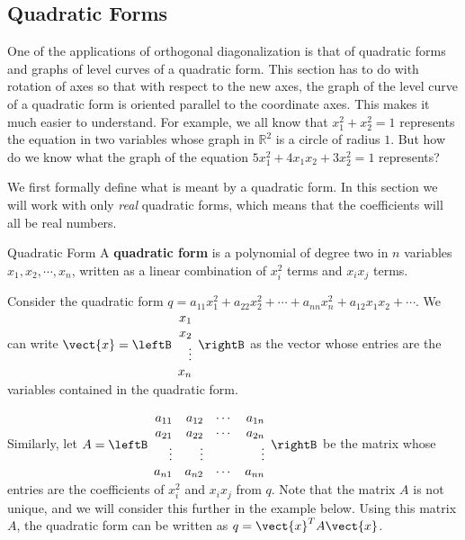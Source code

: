 \subsection{Quadratic Forms}

One of the applications of orthogonal diagonalization is that of quadratic forms and graphs of level curves of a quadratic form. This section has to do with rotation of axes
so that with respect to the new axes, the graph of the level curve of a
quadratic form is oriented parallel to the coordinate axes. This makes it
much easier to understand. For example, we all know that $x_1^2 + x_2^2=1$ represents the equation in two variables whose graph in $\mathbb{R}^2$ is a circle of radius $1$. But how do we know what the graph of the equation $5x_1^2 + 4x_1x_2 + 3x_2^2=1$ represents?  

We first formally define what is meant by a quadratic form. In this section we will work with only \textit{real} quadratic forms, which means that the coefficients will all be real numbers. 

\begin{definition}{Quadratic Form}\label{def:quadraticform}
A \textbf{quadratic form} is a polynomial of degree two in $n$ variables $x_1, x_2, \cdots, x_n$, written as a linear combination of $x_i^{2}$ terms and $x_ix_j$ terms. 
\end{definition}

Consider the quadratic form $q = a_{11}x_1^2 + a_{22}x_2^2 + \cdots + a_{nn}x_n^2 + a_{12}x_1x_2 + \cdots$. We can write $\vect{x} = \leftB 
\begin{array}{r}
x_1 \\
x_2 \\
\vdots \\
x_n
\end{array} \rightB$ as the vector whose entries are the variables contained in the quadratic form.

Similarly, let $A = \leftB
\begin{array}{rrrr}
a_{11} & a_{12} & \cdots & a_{1n} \\
a_{21} & a_{22} & \cdots & a_{2n} \\
\vdots & \vdots & & \vdots \\
a_{n1} & a_{n2} & \cdots & a_{nn}
\end{array}
\rightB$ be the matrix whose entries are the coefficients of $x_i^2$ and $x_ix_j$ from $q$. Note that the matrix $A$ is not unique, and we will consider this further in the example below. Using this matrix $A$,  the quadratic form can be written as $q = \vect{x}^T A \vect{x}$. 

